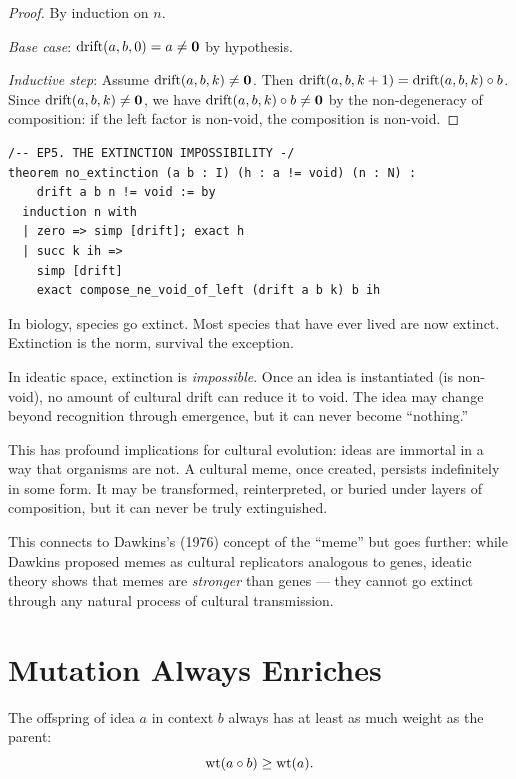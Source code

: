 \begin{proof}
By induction on $n$.

\emph{Base case}: $\text{drift}(a,b,0) = a \neq \mathbf{0}$ by hypothesis.

\emph{Inductive step}: Assume $\text{drift}(a,b,k) \neq \mathbf{0}$. Then $\text{drift}(a,b,k+1) = \text{drift}(a,b,k) \circ b$. Since $\text{drift}(a,b,k) \neq \mathbf{0}$, we have $\text{drift}(a,b,k) \circ b \neq \mathbf{0}$ by the non-degeneracy of composition: if the left factor is non-void, the composition is non-void.
\end{proof}

\begin{lstlisting}
/-- EP5. THE EXTINCTION IMPOSSIBILITY -/
theorem no_extinction (a b : I) (h : a != void) (n : N) :
    drift a b n != void := by
  induction n with
  | zero => simp [drift]; exact h
  | succ k ih =>
    simp [drift]
    exact compose_ne_void_of_left (drift a b k) b ih
\end{lstlisting}

\begin{paradox}
In biology, species go extinct. Most species that have ever lived are now extinct. Extinction is the norm, survival the exception.

In ideatic space, extinction is \emph{impossible}. Once an idea is instantiated (is non-void), no amount of cultural drift can reduce it to void. The idea may change beyond recognition through emergence, but it can never become ``nothing.''

This has profound implications for cultural evolution: ideas are immortal in a way that organisms are not. A cultural meme, once created, persists indefinitely in some form. It may be transformed, reinterpreted, or buried under layers of composition, but it can never be truly extinguished.

This connects to Dawkins's (1976) concept of the ``meme'' but goes further: while Dawkins proposed memes as cultural replicators analogous to genes, ideatic theory shows that memes are \emph{stronger} than genes --- they cannot go extinct through any natural process of cultural transmission.
\end{paradox}

\section{Mutation Always Enriches}

\begin{theorem}
\label{thm:beneficial-mutations}
The offspring of idea $a$ in context $b$ always has at least as much weight as the parent:
\[
\operatorname{wt}(a \circ b) \geq \operatorname{wt}(a).
\]
\end{theorem}

